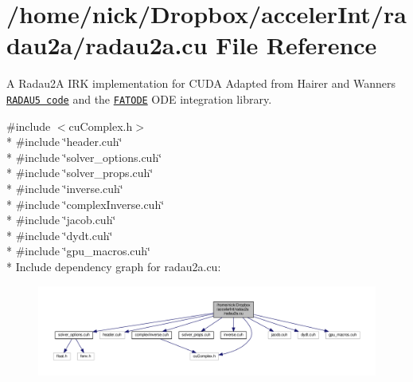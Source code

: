 \hypertarget{radau2a_8cu}{}\section{/home/nick/\+Dropbox/acceler\+Int/radau2a/radau2a.cu File Reference}
\label{radau2a_8cu}


A Radau2A I\+RK implementation for C\+U\+DA Adapted from Hairer and Wanner\textquotesingle{}s \href{http://www.unige.ch/~hairer/prog/stiff/radau5.f}{\tt R\+A\+D\+A\+U5 code} and the \href{http://people.cs.vt.edu/~asandu/Software/FATODE/index.html}{\tt F\+A\+T\+O\+DE} O\+DE integration library.  


{\ttfamily \#include $<$cu\+Complex.\+h$>$}\\*
{\ttfamily \#include \char`\"{}header.\+cuh\char`\"{}}\\*
{\ttfamily \#include \char`\"{}solver\+\_\+options.\+cuh\char`\"{}}\\*
{\ttfamily \#include \char`\"{}solver\+\_\+props.\+cuh\char`\"{}}\\*
{\ttfamily \#include \char`\"{}inverse.\+cuh\char`\"{}}\\*
{\ttfamily \#include \char`\"{}complex\+Inverse.\+cuh\char`\"{}}\\*
{\ttfamily \#include \char`\"{}jacob.\+cuh\char`\"{}}\\*
{\ttfamily \#include \char`\"{}dydt.\+cuh\char`\"{}}\\*
{\ttfamily \#include \char`\"{}gpu\+\_\+macros.\+cuh\char`\"{}}\\*
Include dependency graph for radau2a.\+cu\+:
\nopagebreak
\begin{figure}[H]
\begin{center}
\leavevmode
\includegraphics[width=350pt]{radau2a_8cu__incl}
\end{center}
\end{figure}
